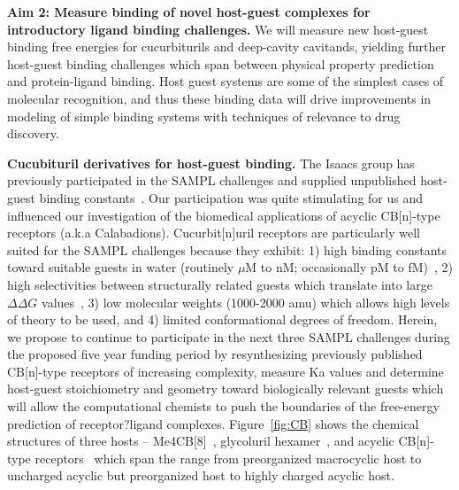 \documentclass[11pt]{article}
\begin{document}

{\bf Aim 2: Measure binding of novel host-guest complexes for introductory ligand binding challenges.}
We will measure new host-guest binding free energies for cucurbiturils and deep-cavity cavitands, yielding further host-guest binding challenges which span between physical property prediction and protein-ligand binding. Host guest systems are some of the simplest cases of molecular recognition, and thus these binding data will drive improvements in modeling of simple binding systems with techniques of relevance to drug discovery.

{\bf Cucubituril derivatives for host-guest binding.} The Isaacs group has previously participated in the SAMPL challenges and supplied unpublished host-guest binding constants~\cite{ma_acyclic_2012-2, cao_absolute_2014, She_she_glycoluril-derived_2016}.  Our participation was quite stimulating for us and influenced our investigation of the biomedical applications of acyclic CB[n]-type receptors (a.k.a Calabadions). Cucurbit[n]uril receptors are particularly well suited for the SAMPL challenges because they exhibit: 1) high binding constants toward suitable guests in water (routinely $\mu$M to nM; occasionally pM to fM)~\cite{cao_attomolar_2014, liu_cucurbituril_2005, mock_structure_1986, assaf_cucurbiturils:_2015, moghaddam_new_2011, shetty_can_2015, biedermann_release_2012}, 2) high selectivities between structurally related guests which translate into large $\Delta \Delta G$ values~\cite{isaacs_stimuli_2014}, 3) low molecular weights (1000-2000 amu) which allows high levels of theory to be used, and 4) limited conformational degrees of freedom.  Herein, we propose to continue to participate in the next three SAMPL challenges during the proposed five year funding period by resynthesizing previously published CB[n]-type receptors of increasing complexity, measure Ka values and determine host-guest stoichiometry and geometry toward biologically relevant guests which will allow the computational chemists to push the boundaries of the free-energy prediction of receptor?ligand complexes.  Figure~\ref{fig:CB} shows the chemical structures of three hosts -- Me4CB[8]~\cite{vinciguerra_synthesis_2015}, glycoluril hexamer~\cite{lucas_templated_2011}, and acyclic CB[n]-type receptors~\cite{ma_acyclic_2012, ma_acyclic_2012-1, zhang_acyclic_2014, gilberg_acyclic_2015, sigwalt_acyclic_2016, zhang_acyclic_2014-1} which span the range from preorganized macrocyclic host to uncharged acyclic but preorganized host to highly charged acyclic host.
\end{document}
